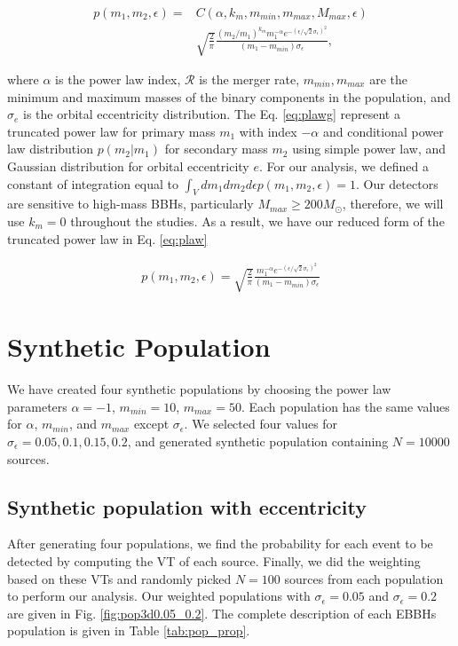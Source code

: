 \documentclass[twocolumn,prd,nofootinbib]{revtex4}
\begin{document}
\begin{align}
\label{eq:plawg}
p(m_1,m_2,\epsilon) = &C(\alpha,k_m,m_{min},m_{max},M_{max},\epsilon)  
\nonumber \\ & \sqrt{\frac{2}{\pi}} \frac{(m_2/m_1)^{k_m} m_1^{-\alpha} e^{-(\epsilon/\sqrt{2}\sigma_\epsilon)^2}}{(m_1-m_{min})\sigma_\epsilon},
\end{align}

where $\alpha$ is the power law index, $\mathcal{R}$ is the merger rate, $m_{min}, m_{max}$ are the minimum and maximum masses of the binary components in the population, and $\sigma_e$ is the orbital eccentricity distribution. The Eq. \ref{eq:plawg} represent a truncated power law for primary mass $m_1$ with index $-\alpha$ and conditional power law distribution $p(m_2|m_1)$ for secondary mass $m_2$ using simple power law, and Gaussian distribution for orbital eccentricity $e$. 
For our analysis, we defined a constant of integration equal to $\int_V dm_1 dm_2 d\epsilon p(m_1,m_2,\epsilon) = 1$.  Our detectors are sensitive to high-mass BBHs, particularly $M_{max}\geq 200 M_\odot$, therefore, we will use $k_m=0$ throughout the studies. As a result, we have our reduced form of the truncated power law in Eq. \ref{eq:plaw}

\begin{align}
\label{eq:plaw}
p(m_1,m_2,\epsilon) = \sqrt{\frac{2}{\pi}} \frac{ m_1^{-\alpha}  e^{-(\epsilon/\sqrt{2}\sigma_\epsilon)^2}}{(m_1-m_{min})\sigma_\epsilon}
\end{align}

\section{Synthetic Population}

We have created four synthetic populations by choosing the power law parameters $\alpha = -1$, $m_{min} = 10$, $m_{max}=50$. Each population has the same values for $\alpha$, $m_{min}$, and $m_{max}$ except $\sigma_\epsilon$. We selected four values for $\sigma_\epsilon = 0.05, 0.1, 0.15, 0.2$, and  generated synthetic population containing $N=10000$ sources.

\subsection{Synthetic population with eccentricity}

After generating four populations, we find the probability for each event to be detected by computing the VT of each source. Finally, we did the weighting based on these VTs and randomly picked $N=100$ sources from each population to perform our analysis. Our weighted populations with $\sigma_\epsilon=0.05$ and $\sigma_\epsilon=0.2$ are given in Fig. \ref{fig:pop3d0.05_0.2}.  The complete description of each EBBHs population is given in Table \ref{tab:pop_prop}.
\end{document}
